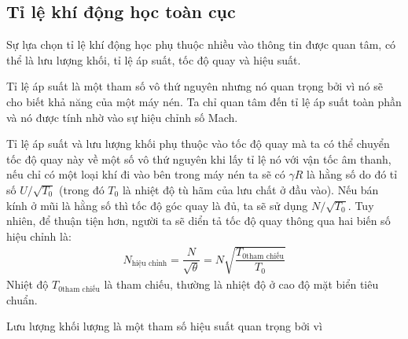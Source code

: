 \documentclass[MAY_THUY_KHI.tex]{subfiles}
\begin{document}
\subsection{Tỉ lệ khí động học toàn cục}
        Sự lựa chọn tỉ lệ khí động học phụ thuộc nhiều vào thông tin được quan tâm, có thể là lưu lượng khối, tỉ lệ áp suất, tốc độ quay và hiệu suất. 

        Tỉ lệ áp suất là một tham số vô thứ nguyên nhưng nó quan trọng bởi vì nó sẽ cho biết khả năng của một máy nén. Ta chỉ quan tâm đến tỉ lệ áp suất toàn phần và nó được tính nhờ vào sự hiệu chỉnh số Mach.

        Tỉ lệ áp suất và lưu lượng khối phụ thuộc vào tốc độ quay mà ta có thể chuyển tốc độ quay này về một số vô thứ nguyên khi lấy tỉ lệ nó với vận tốc âm thanh, nếu chỉ có một loại khí đi vào bên trong máy nén ta sẽ có $\gamma R$ là hằng số do đó tỉ số $U/\sqrt{T_0}$ (trong đó $T_0$ là nhiệt độ tù hãm của lưu chất ở đầu vào). Nếu bán kính ở mũi là hằng số thì tốc độ góc quay là đủ, ta sẽ sử dụng $N/\sqrt{T_0}$. Tuy nhiên, để thuận tiện hơn, người ta sẽ diển tả tốc độ quay thông qua hai biến số hiệu chỉnh là:
            \begin{align}
                N_{\text{hiệu chỉnh}}=\dfrac{N}{\sqrt{\theta}}=N\sqrt{\dfrac{T_{0\text{tham chiếu}}}{T_0}}
            \end{align}
        Nhiệt độ $T_{0\text{tham chiếu}}$ là tham chiếu, thường là nhiệt độ ở cao độ mặt biển tiêu chuẩn. 

        Lưu lượng khối lượng là một tham số hiệu suất quan trọng bởi vì 
\end{document}
